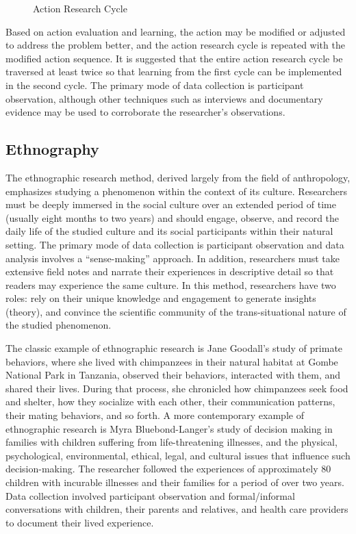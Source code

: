 \begin{figure}[H]
	\centering
	\caption{Action Research Cycle}
	\label{13:fig01}
\end{figure}

Based on action evaluation and learning, the action may be modified or adjusted to address the problem better, and the action research cycle is repeated with the modified action sequence. It is suggested that the entire action research cycle be traversed at least twice so that learning from the first cycle can be implemented in the second cycle. The primary mode of data collection is participant observation, although other techniques such as interviews and documentary evidence may be used to corroborate the researcher's observations.

\subsection{Ethnography}

The ethnographic research method, derived largely from the field of anthropology, emphasizes studying a phenomenon within the context of its culture. Researchers must be deeply immersed in the social culture over an extended period of time (usually eight months to two years) and should engage, observe, and record the daily life of the studied culture and its social participants within their natural setting. The primary mode of data collection is participant observation and data analysis involves a ``sense-making'' approach. In addition, researchers must take extensive field notes and narrate their experiences in descriptive detail so that readers may experience the same culture. In this method, researchers have two roles: rely on their unique knowledge and engagement to generate insights (theory), and convince the scientific community of the trans-situational nature of the studied phenomenon.

The classic example of ethnographic research is Jane Goodall's study of primate behaviors, where she lived with chimpanzees in their natural habitat at Gombe National Park in Tanzania, observed their behaviors, interacted with them, and shared their lives. During that process, she chronicled how chimpanzees seek food and shelter, how they socialize with each other, their communication patterns, their mating behaviors, and so forth. A more contemporary example of ethnographic research is Myra Bluebond-Langer's\cite{bluebond2000shadow} study of decision making in families with children suffering from life-threatening illnesses, and the physical, psychological, environmental, ethical, legal, and cultural issues that influence such decision-making. The researcher followed the experiences of approximately $ 80 $ children with incurable illnesses and their families for a period of over two years. Data collection involved participant observation and formal/informal conversations with children, their parents and relatives, and health care providers to document their lived experience.

